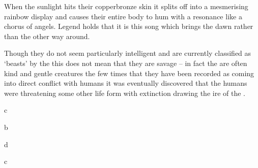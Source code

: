 {{When the sunlight hits their copper\minus{}bronze skin\comma{} it splits off into a mesmerising rainbow display\comma{} and causes their entire body to hum with a resonance like a chorus of angels. Legend holds that it is this song which brings the dawn\comma{} rather than the other way around.

Though they do not seem particularly intelligent\comma{} and are currently classified as `beasts’ by the \comma{} this does not mean that they are savage – in fact\comma{} the \name{} are often kind and gentle creatures\comma{} the few times that they have been recorded as coming into direct conflict with humans it was eventually discovered that the humans were threatening some other life form with extinction\comma{} drawing the ire of the \name{}.}



}




{
	c
}
{



















}








{
	b
}
{







}








{
	d
}
{










}




{
	c
}
{










}




